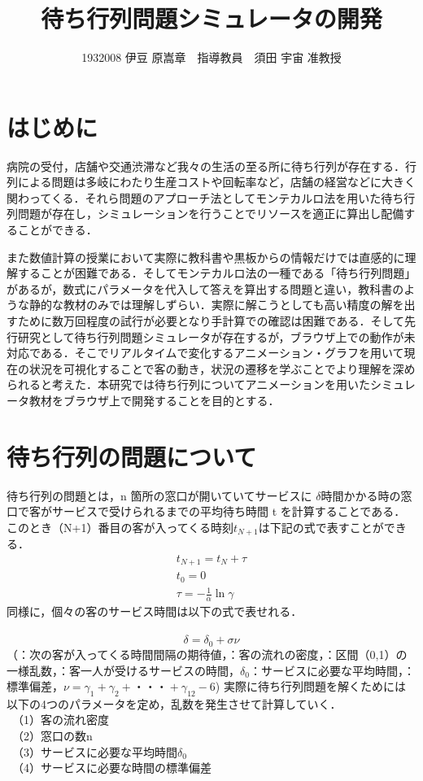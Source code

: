 \documentclass[twocolumn,10pt,a4j]{ltjsarticle}
\title{待ち行列問題シミュレータの開発}
\author{1932008 伊豆
原嵩章　指導教員　須田 宇宙 准教授}
\date{}
\begin{document}
\maketitle

\section{はじめに}
病院の受付，店舗や交通渋滞など我々の生活の至る所に待ち行列が存在する．行列による問題は多岐にわたり生産コストや回転率など，店舗の経営などに大きく関わってくる．それら問題のアプローチ法としてモンテカルロ法を用いた待ち行列問題が存在し，シミュレーションを行うことでリソースを適正に算出し配備することができる．

また数値計算の授業において実際に教科書や黒板からの情報だけでは直感的に理解することが困難である．そしてモンテカルロ法の一種である「待ち行列問題」があるが，数式にパラメータを代入して答えを算出する問題と違い，教科書のような静的な教材のみでは理解しずらい．実際に解こうとしても高い精度の解を出すために数万回程度の試行が必要となり手計算での確認は困難である．そして先行研究として待ち行列問題シミュレータが存在するが，ブラウザ上での動作が未対応である．そこでリアルタイムで変化するアニメーション・グラフを用いて現在の状況を可視化することで客の動き，状況の遷移を学ぶことでより理解を深められると考えた．本研究では待ち行列についてアニメーションを用いたシミュレータ教材をブラウザ上で開発することを目的とする．

\section{待ち行列の問題について}
待ち行列の問題とは，n 箇所の窓口が開いていてサービスに $\delta$時間かかる時の窓口で客がサービスで受けられるまでの平均待ち時間 t を計算することである．このとき（N+1）番目の客が入ってくる時刻$t_{N+1}$は下記の式で表すことができる．\\
\vspace{-11mm}
\begin{eqnarray}
t_{N+1}=t_N+\tau\\
t_0=0\\　
\tau=-\frac{1}{\alpha}\ln\gamma
\end{eqnarray}
同様に，個々の客のサービス時間は以下の式で表せれる．\\　
\vspace{-5mm}
\begin{equation}
\delta=\delta_0+\sigma\nu
\end{equation}
\vspace{-1mm}
（\tau：次の客が入ってくる時間間隔の期待値，\alpha：客の流れの密度，\gamma：区間（0,1）の一様乱数，\delta：客一人が受けるサービスの時間，$\delta_0$：サービスに必要な平均時間，\sigma：標準偏差，$\nu=\gamma_1+\gamma_2+・・・+\gamma_{12}-6$)
実際に待ち行列問題を解くためには以下の4つのパラメータを定め，乱数を発生させて計算していく．\\
　（1）客の流れ密度\alpha\\
　（2）窓口の数n\\
　（3）サービスに必要な平均時間$\delta_0$\\
　（4）サービスに必要な時間の標準偏差\sigma\\
\end{document}
